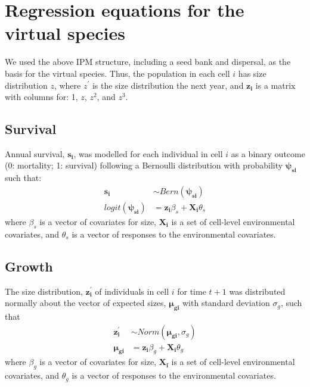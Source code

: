 \documentclass[]{article}
\begin{document}
\newpage
\section{Regression equations for the virtual species}

We used the above IPM structure, including a seed bank and dispersal, as
the basis for the virtual species. Thus, the population in each cell
\(i\) has size distribution \(z\), where \(z^{\prime}\) is the size
distribution the next year, and \(\boldsymbol{z_i}\) is a matrix with
columns for: 1, \(z\), \(z^2\), and \(z^3\).

\subsection{Survival}

Annual survival, \(\boldsymbol{s_i}\), was modelled for each individual
in cell \(i\) as a binary outcome (0: mortality; 1: survival) following
a Bernoulli distribution with probability \(\boldsymbol{\psi_{si}}\)
such that: \begin{align}
\boldsymbol{s_i} & \sim Bern(\boldsymbol{\psi_{si}}) \\
logit(\boldsymbol{\psi_{si}}) & = \boldsymbol{z_i}\beta_{s} + \boldsymbol{X_i}\theta_{s}
\end{align} where \(\beta_{s}\) is a vector of covariates for size,
\(\boldsymbol{X_i}\) is a set of cell-level environmental covariates,
and \(\theta_{s}\) is a vector of responses to the environmental
covariates.

\subsection{Growth}

The size distribution, \(\boldsymbol{z^{\prime}_i}\) of individuals in
cell \(i\) for time \(t+1\) was distributed normally about the vector of
expected sizes, \(\boldsymbol{\mu_{gi}}\) with standard deviation
\(\sigma_g\), such that \begin{align}
\boldsymbol{z^{\prime}_i} &\sim Norm(\boldsymbol{\mu_{gi}}, \sigma_g) \\
\boldsymbol{\mu_{gi}} &= \boldsymbol{z_i}\beta_{g} + \boldsymbol{X_i}\theta_{g}
\end{align} where \(\beta_{g}\) is a vector of covariates for size,
\(\boldsymbol{X_i}\) is a set of cell-level environmental covariates,
and \(\theta_{g}\) is a vector of responses to the environmental
covariates.
\end{document}
